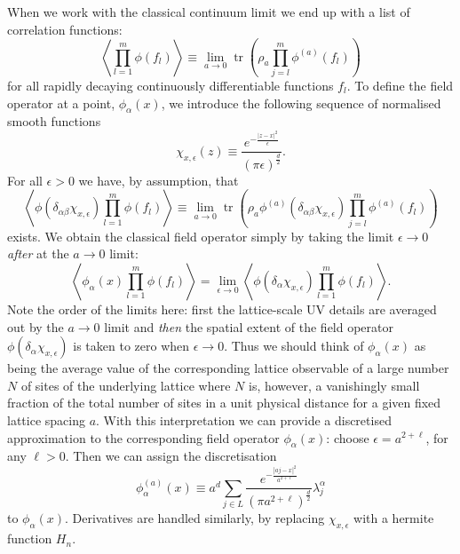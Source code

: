\documentclass[prl,twocolumn,lengthcheck,superscriptaddress]{revtex4-1}
\newcommand{\tr}{\operatorname{tr}}
\theoremstyle{definition}
\theoremstyle{remark}
\begin{document}
When we work with the classical continuum limit we end up with a list of correlation functions:
\begin{equation}
	\left\langle\prod_{l=1}^m\phi(f_l)\right\rangle \equiv \lim_{a\rightarrow 0} \tr\left(\rho_a \prod_{j=l}^m\phi^{(a)}(f_l)\right)
\end{equation}
for all rapidly decaying continuously differentiable functions $f_l$. To define the field operator at a point, $\phi_\alpha(x)$, we introduce the following sequence of normalised smooth functions
\begin{equation}
	\chi_{x,\epsilon}(z) \equiv \frac{e^{-\frac{|z-x|^2}{\epsilon}}}{(\pi \epsilon)^{\frac{d}{2}}}.
\end{equation}
For all $\epsilon > 0$ we have, by assumption, that 
\begin{equation}
	\left\langle\phi(\delta_{\alpha\beta}\chi_{x,\epsilon})\prod_{l=1}^m\phi(f_l)\right\rangle \equiv \lim_{a\rightarrow 0} \tr\left(\rho_a \phi^{(a)}(\delta_{\alpha\beta}\chi_{x,\epsilon})\prod_{j=l}^m\phi^{(a)}(f_l)\right)
\end{equation}
exists. We obtain the classical field operator simply by taking the limit $\epsilon\rightarrow 0$ \emph{after} at the $a\rightarrow 0$ limit:
\begin{equation}
	\left\langle\phi_\alpha(x)\prod_{l=1}^m\phi(f_l)\right\rangle = \lim_{\epsilon\rightarrow 0}\left\langle\phi(\delta_{\alpha}\chi_{x,\epsilon})\prod_{l=1}^m\phi(f_l)\right\rangle.
\end{equation}
Note the order of the limits here: first the lattice-scale UV details are averaged out by the $a\rightarrow 0$ limit and \emph{then} the spatial extent of the field operator $\phi(\delta_{\alpha}\chi_{x,\epsilon})$ is taken to zero when $\epsilon\rightarrow 0$. Thus we should think of $\phi_\alpha(x)$ as being the average value of the corresponding lattice observable of a large number $N$ of sites of the underlying lattice where $N$ is, however, a vanishingly small fraction of the total number of sites in a unit physical distance for a given fixed lattice spacing $a$. With this interpretation we can provide a discretised approximation to the corresponding field operator $\phi_\alpha(x)$: choose $\epsilon = a^{2+\ell}$, for any $\ell>0$. Then we can assign the discretisation 
\begin{equation}
	\phi^{(a)}_\alpha(x) \equiv a^d\sum_{j\in L}\frac{e^{-\frac{|aj-x|^2}{a^{2+\ell}}}}{(\pi a^{2+\ell})^{\frac{d}{2}}} \lambda^{\alpha}_j
\end{equation}
to $\phi_\alpha(x)$. Derivatives are handled similarly, by replacing $\chi_{x,\epsilon}$ with a hermite function $H_n$.
\end{document}
